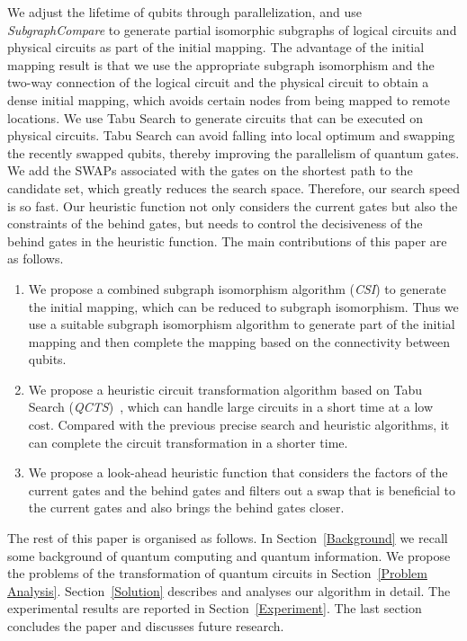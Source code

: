 \documentclass[runningheads]{llncs}
\begin{document}
We adjust the lifetime of qubits through parallelization, and use \textit{SubgraphCompare} to generate partial isomorphic subgraphs of logical circuits and physical circuits as part of the initial mapping. The advantage of the initial mapping result is that we use the appropriate subgraph isomorphism and the two-way connection of the logical circuit and the physical circuit to obtain a dense initial mapping, which avoids certain nodes from being mapped to remote locations. We use Tabu Search to generate circuits that can be executed on physical circuits. Tabu Search can avoid falling into local optimum and swapping the recently swapped qubits, thereby improving the parallelism of quantum gates. We add the SWAPs associated with the gates on the shortest path to the candidate set, which greatly reduces the search space. Therefore, our search speed is so fast. Our heuristic function not only considers the current gates but also the constraints of the behind gates, but needs to control the decisiveness of the behind gates in the heuristic function.
The main contributions of this paper are as follows.
	\begin{enumerate}
		\item We propose a combined subgraph isomorphism algorithm (\textit{CSI}) to generate the initial mapping, which can be reduced to subgraph isomorphism. Thus we use a suitable subgraph isomorphism algorithm to generate part of the initial mapping and then complete the mapping based on the connectivity between qubits.
		\item We propose a heuristic circuit transformation algorithm based on Tabu Search (\textit{QCTS})~\cite{Glover1990}, which can handle large circuits in a short time at a low cost. Compared with the previous precise search and heuristic algorithms, it can complete the circuit transformation in a shorter time. 
		\item  We propose a look-ahead heuristic function that considers the factors of the current gates and the behind gates and filters out a swap that is beneficial to the current gates and also brings the behind gates closer.
	\end{enumerate}

The rest of this paper is organised as follows.
In Section~\ref{Background} we recall some background of quantum computing and quantum information.
We propose the problems of the transformation of quantum circuits in Section~\ref{Problem Analysis}.
Section~\ref{Solution} describes and analyses our algorithm in detail.
The experimental results are reported in Section~\ref{Experiment}. 
The last section concludes the paper and discusses future research.
\end{document}
